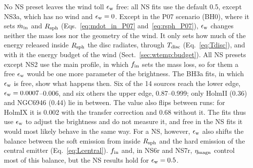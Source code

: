 No NS preset leaves the wind toll $\epsilon_{\rm w}$ free: all NS fits use the default 0.5, except NS3a, which has no wind and $\epsilon_{\rm w} = 0$.
Except in the P07 scenario (BH0), where it sets $\dot m_{\rm in}$ and $R_{\rm sph}$ (Eqs.~\ref{eq:mdot_in_P07} and~\ref{eq:rsph_P07}), $\epsilon_{\rm w}$ changes neither the mass loss nor the geometry of the wind.
It only sets how much of the energy released inside $R_{\rm sph}$ the disc radiates, through $T_{\rm disc}$ (Eq.~\ref{eq:Tdisc}), and with it the energy budget of the wind (Sect.~\ref{sec:wtemp:budget}).
All NS presets except NS2 use the main profile, in which $f_{\rm in}$ sets the mass loss, so for them a free $\epsilon_{\rm w}$ would be one more parameter of the brightness.
The BH3a fits, in which $\epsilon_{\rm w}$ is free, show what happens then.
Six of the 14 sources reach the lower edge, $\epsilon_{\rm w} = 0.0007$--0.006, and six others the upper edge, 0.87--0.999; only HolmII (0.36) and NGC6946 (0.44) lie in between.
The value also flips between runs: for HolmIX it is 0.002 with the transfer correction and 0.68 without it.
The fits thus use $\epsilon_{\rm w}$ to adjust the brightness and do not measure it, and free in the NS fits it would most likely behave in the same way.
For a NS, however, $\epsilon_{\rm w}$ also shifts the balance between the soft emission from inside $R_{\rm sph}$ and the hard emission of the central emitter (Eq.~\ref{eq:Lcentral}).
$f_{\rm in}$ and, in NS6r and NS7r, $\eta_{\rm magn}$ control most of this balance, but the NS results hold for $\epsilon_{\rm w} = 0.5$.

